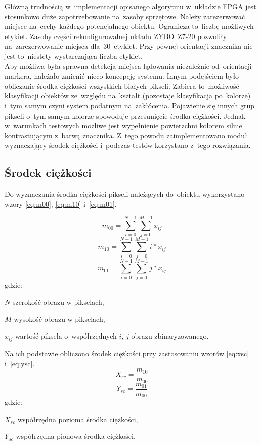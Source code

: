 Główną trudnością w~implementacji opisanego algorytmu w~układzie FPGA jest stosunkowo duże zapotrzebowanie na~zasoby sprzętowe. 
Należy zarezerwować miejsce na~cechy każdego potencjalnego obiektu. 
Ogranicza to~liczbę możliwych etykiet. 
Zasoby części rekonfigurowalnej układu ZYBO~Z7-20 pozwoliły na~zarezerwowanie miejsca dla~30~etykiet. Przy pewnej orientacji znacznika nie jest to~niestety wystarczająca liczba etykiet. \\
Aby możliwa była sprawna detekcja miejsca lądowania niezależnie od~orientacji markera, należało zmienić nieco koncepcję systemu. Innym podejściem było obliczanie środka ciężkości wszystkich białych pikseli. Zabiera to~możliwość klasyfikacji obiektów ze~względu na~kształt (pozostaje klasyfikacja po~kolorze) i~tym samym czyni system podatnym na~zakłócenia. Pojawienie się innych grup pikseli o~tym samym kolorze spowoduje przesunięcie środka ciężkości. Jednak w~warunkach testowych możliwe jest wypełnienie powierzchni kolorem silnie kontrastującym z~barwą znacznika. Z~tego powodu zaimplementowano moduł wyznaczający środek ciężkości i~podczas testów korzystano z~tego rozwiązania.
\subsection{Środek ciężkości}
\label{subsec:srodek_ciezosci}

Do wyznaczania środka ciężkości pikseli należących do~obiektu wykorzystano wzory \eqref{eq:m00}, \eqref{eq:m10} i~\eqref{eq:m01}.

\begin{equation}
\label{eq:m00}
m_{00}=\sum_{i=0}^{N-1}\sum_{j=0}^{M-1} x_{ij}
\end{equation}
\begin{equation}
\label{eq:m10}
m_{10}=\sum_{i=0}^{N-1}\sum_{j=0}^{M-1} i*x_{ij}
\end{equation}
\begin{equation}
\label{eq:m01}
m_{01}=\sum_{i=0}^{N-1}\sum_{j=0}^{M-1} j*x_{ij}
\end{equation}
gdzie:
\begin{eqwhere}[2cm]
	\item[$N$] szerokość obrazu w pikselach,
	\item[$M$] wysokość obrazu w pikselach,
	\item[$x_{ij}$] wartość piksela o~współrzędnych $i$, $j$ obrazu zbinaryzowanego.
\end{eqwhere}
Na ich podstawie obliczono środek ciężkości przy zastosowaniu wzorów \eqref{eq:xsc} i~\eqref{eq:ysc}.
\begin{equation}
\label{eq:xsc}
X_{sc}=\frac{m_{10}}{m_{00}}
\end{equation}
\begin{equation}
\label{eq:ysc}
Y_{sc}=\frac{m_{01}}{m_{00}}
\end{equation}
gdzie:
\begin{eqwhere}[2cm]
	\item[$X_{sc}$] współrzędna pozioma środka ciężkości,
	\item[$Y_{sc}$] współrzędna pionowa środka ciężkości.
\end{eqwhere}

